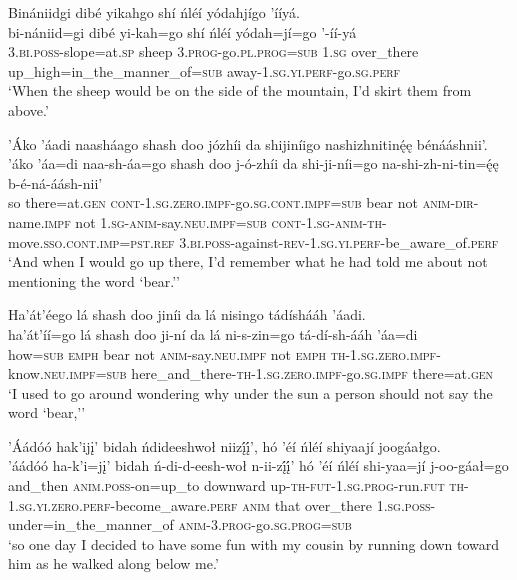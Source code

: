 \largerpage
\ea\label{ex:text6-3-9}
Binániidgi dibé yikahgo shí ńléí yódahjígo ’ííyá.\\
\gll bi-nániid=gi	dibé	yi-kah=go	shí	ńléí	yódah=jí=go	’-íí-yá\\
     3.\textsc{bi}.\textsc{poss}-slope=at.\textsc{sp}	sheep	3.\textsc{prog}-go.\textsc{pl}.\textsc{prog}=\textsc{sub}	1.\textsc{sg}	over\_there	up\_high=in\_the\_manner\_of=\textsc{sub}	away-1.\textsc{sg}.\textsc{yi}.\textsc{perf}-go.\textsc{sg}.\textsc{perf}\\
\glt `When the sheep would be on the side of the mountain, I'd skirt them from above.'
\z

\ea\label{ex:text6-3-10}
’Áko ’áadi naasháago shash doo józhíi da shijiníigo nashizhnitinę́ę bénááshnii’.\\
\gll ’áko	’áa=di	naa-sh-áa=go	shash	doo	j-ó-zhíi	da	shi-ji-níi=go	na-shi-zh-ni-tin=ę́ę	b-é-ná-áásh-nii’\\
     so	there=at.\textsc{gen}	\textsc{cont}-1.\textsc{sg}.\textsc{zero}.\textsc{impf}-go.\textsc{sg}.\textsc{cont}.\textsc{impf}=\textsc{sub}	bear	not	\textsc{anim}-\textsc{dir}-name.\textsc{impf}	not	1.\textsc{sg}-\textsc{anim}-say.\textsc{neu}.\textsc{impf}=\textsc{sub}	\textsc{cont}-1.\textsc{sg}-\textsc{anim}-\textsc{th}-move.\textsc{sso}.\textsc{cont}.\textsc{imp}=\textsc{pst}.\textsc{ref}	3.\textsc{bi}.\textsc{poss}-against-\textsc{rev}-1.\textsc{sg}.\textsc{yi}.\textsc{perf}-be\_aware\_of.\textsc{perf}\\
\glt `And when I would go up there, I'd remember what he had told me about not mentioning the word `bear.'{'}
\z

\ea\label{ex:text6-3-11}
Ha’át’éego lá shash doo jiníi da lá nisingo tádíshááh ’áadi.\\
\gll ha’át’íí=go	lá	shash	doo	ji-ní	da	lá	ni-s-zin=go	tá-dí-sh-ááh	’áa=di\\
     how=\textsc{sub}	\textsc{emph}	bear	not	\textsc{anim}-say.\textsc{neu}.\textsc{impf}	not	\textsc{emph}	\textsc{th}-1.\textsc{sg}.\textsc{zero}.\textsc{impf}-know.\textsc{neu}.\textsc{impf}=\textsc{sub}	here\_and\_there-\textsc{th}-1.\textsc{sg}.\textsc{zero}.\textsc{impf}-go.\textsc{sg}.\textsc{impf}	there=at.\textsc{gen}\\
\glt `I used to go around wondering why under the sun a person should not say the word `bear,'{'}
\z

\ea\label{ex:text6-3-12}
’Áádóó hak’ijį’ bidah ńdideeshwoł niizį́į́’, hó ’éí ńléí shiyaají joogáałgo.\\
\gll ’áádóó	ha-k’i=jį’	bidah	ń-di-d-eesh-woł	n-ii-zį́į́’	hó	’éí	ńléí	shi-yaa=jí	j-oo-gáał=go\\
     and\_then	\textsc{anim}.\textsc{poss}-on=up\_to	downward	up-\textsc{th}-\textsc{fut}-1.\textsc{sg}.\textsc{prog}-run.\textsc{fut}	\textsc{th}-1.\textsc{sg}.\textsc{yi}.\textsc{zero}.\textsc{perf}-become\_aware.\textsc{perf}	\textsc{anim}	that	over\_there	1.\textsc{sg}.\textsc{poss}-under=in\_the\_manner\_of	\textsc{anim}-3.\textsc{prog}-go.\textsc{sg}.\textsc{prog}=\textsc{sub}\\
\glt `so one day I decided to have some fun with my cousin by running down toward him as he walked along below me.'
\z

